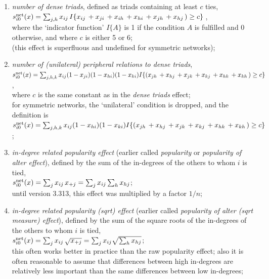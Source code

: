 \documentclass[a4paper,fleqn]{article}
\newcommand{\+}{\, + \,}
\newcommand{\vit}{\theenumi}
\begin{document}
{\begin{enumerate}
 \item {\em number of dense triads}, defined as triads containing at least $c$ ties,\\
 $s^{\rm net}_{i\vit}(x) =  \sum_{j,h} x_{ij} \, I\{ x_{ij}\, + x_{ji}\, + x_{ih}\, + x_{hi}\,
 + x_{jh}\, + x_{hj}\,)\geq c \}\,$,\\
 where the `indicator function' $I\{A\}$ is 1 if the condition
 $A$ is fulfilled and 0 otherwise, and where $c$ is either 5 or 6;\\
  (this effect is superfluous and undefined for symmetric networks);

 \item {\em number of (unilateral) peripheral relations to dense triads},\\
 $s^{\rm net}_{i\vit}(x) =  \sum_{j,h,k} x_{ij} (1-x_{ji})(1-x_{hi})(1-x_{ki})
 I\{ (x_{jh}\,  + x_{hj}\, + x_{jk}\, + x_{kj}\, + x_{hk}\, + x_{kh}\,)\geq c \} \,$,\\
 where $c$ is the same constant as in the {\it dense triads} effect;\\
 for symmetric networks, the `unilateral' condition is dropped, and the definition is\\
 $s^{\rm net}_{i\vit}(x) =  \sum_{j,h,k} x_{ij} (1-x_{hi})(1-x_{ki})
 I\{ (x_{jh}\,  + x_{hj}\, + x_{jk}\, + x_{kj}\, + x_{hk}\, + x_{kh}\,)\geq c \} \,$;

 \item {\em in-degree related popularity effect}
 (earlier called {\em popularity} or {\em popularity of alter effect}), defined by
  the sum of
 the in-degrees of the others to whom $i$ is tied,\\
 $s^{\rm net}_{i\vit}(x) =  \sum_j x_{ij}\, x_{+j} =
 \sum_j x_{ij} \sum_h x_{hj} $;\\
 until version 3.313, this effect was multiplied by a factor $1/n$;

 \item {\em in-degree related popularity (sqrt) effect}
 (earlier called {\em popularity of alter (sqrt measure) effect}), defined by the sum of
 the square roots of the in-degrees of the others to whom $i$ is tied,\\
 $s^{\rm net}_{i\vit}(x) = \sum_j x_{ij}\, \sqrt{x_{+j}} =
  \sum_j x_{ij} \sqrt{\sum_h x_{hj}} $;\\
 this often works better in practice than the raw popularity effect;
 also it is often reasonable to assume that differences between high in-degrees are
 relatively less important than the same differences between low
 in-degrees;


\end{enumerate}}
\end{document}
